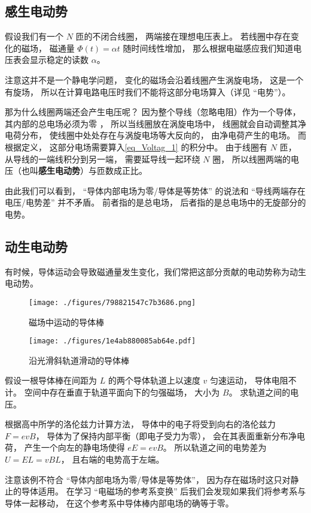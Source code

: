 \subsection{感生电动势}
\begin{example}{}
假设我们有一个 $N$ 匝的不闭合线圈， 两端接在理想电压表上。 若线圈中存在变化的磁场， 磁通量 $\Phi(t) = \alpha t$ 随时间线性增加， 那么根据电磁感应我们知道电压表会显示稳定的读数 $\alpha$。

注意这并不是一个静电学问题， 变化的磁场会沿着线圈产生涡旋电场， 这是一个有旋场， 所以在计算电路电压时我们不能将这部分电场算入（详见 “电势”）。

那为什么线圈两端还会产生电压呢？ 因为整个导线（忽略电阻）作为一个导体， 其内部的总电场必须为零%
， 所以当线圈放在涡旋电场中， 线圈就会自动调整其净电荷分布， 使线圈中处处存在与涡旋电场等大反向的， 由净电荷产生的电场。 而根据定义， 这部分电场需要算入\autoref{eq_Voltag_1} 的积分中。 由于线圈有 $N$ 匝， 从导线的一端线积分到另一端， 需要延导线一起环绕 $N$ 圈， 所以线圈两端的电压（也叫\textbf{感生电动势}）与匝数成正比。
\end{example}

由此我们可以看到， “导体内部电场为零/导体是等势体” 的说法和 “导线两端存在电压/电势差” 并不矛盾。 前者指的是总电场， 后者指的是总电场中的无旋部分的电势。
\subsection{动生电动势}
有时候，导体运动会导致磁通量发生变化，我们常把这部分贡献的电动势称为动生电动势。
\begin{figure}[ht]
\centering
\texttt{[image: ./figures/798821547c7b3686.png]}
\caption{磁场中运动的导体棒} \label{fig_Voltag_3}
\end{figure}

\begin{example}{}
\begin{figure}[ht]
\centering
\texttt{[image: ./figures/1e4ab880085ab64e.pdf]}
\caption{沿光滑斜轨道滑动的导体棒} \label{fig_Voltag_1}
\end{figure}
假设一根导体棒在间距为 $L$ 的两个导体轨道上以速度 $v$ 匀速运动， 导体电阻不计。 空间中存在垂直于轨道平面向下的匀强磁场， 大小为 $B$。 求轨道之间的电压。

根据高中所学的洛伦兹力计算方法， 导体中的电子将受到向右的洛伦兹力 $F = evB$， 导体为了保持内部平衡（即电子受力为零）， 会在其表面重新分布净电荷， 产生一个向左的静电场使得 $eE = evB$。 所以轨道之间的电势差为 $U = EL = vBL$， 且右端的电势高于左端。
\end{example}

注意该例不符合 “导体内部电场为零/导体是等势体”， 因为存在磁场时这只对静止的导体适用。 在学习 “电磁场的参考系变换” 后我们会发现如果我们将参考系与导体一起移动， 在这个参考系中导体棒内部电场的确等于零。
